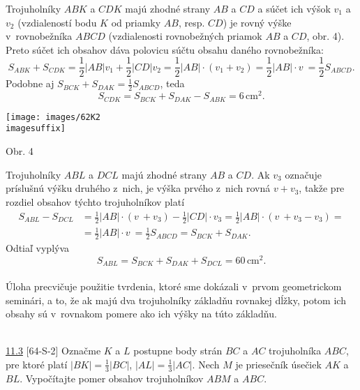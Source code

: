 \rieh Trojuholníky $ABK$ a $CDK$ majú zhodné strany $AB$ a $CD$ a súčet ich výšok $v_1$ a $v_2$ (vzdialeností bodu $K$ od priamky $AB$, resp. $CD$) je rovný výške v~rovnobežníka $ABCD$ (vzdialenosti rovnobežných priamok $AB$ a $CD$, obr. 4). Preto súčet ich obsahov dáva polovicu súčtu obsahu daného rovnobežníka:
$$S_{ABK} + S_{CDK} = \frac{1}{2} |AB|v_1 +\frac{1}{2} |CD|v_2 = \frac{1}{2}|AB| \cdot (v_1 + v_2 ) =\frac{1}{2}|AB| \cdot v~=\frac{1}{2} S_{ABCD}.$$
Podobne aj $S_{BCK} + S_{DAK} =\frac{1}{2} S_{ABCD}$, teda
$$S_{CDK} = S_{BCK} + S_{DAK} - S_{ABK}= 6\,\text{cm}^2.$$
\begin{center}
\texttt{[image: images/62K2\\imagesuffix]}

Obr. 4
\end{center}
Trojuholníky $ABL$ a $DCL$ majú zhodné strany $AB$ a $CD$. Ak $v_3$ označuje príslušnú výšku druhého z~nich, je výška prvého z~nich rovná $v + v_3$, takže pre rozdiel obsahov týchto trojuholníkov platí
\begin{align*}
S_{ABL} - S_{DCL} &= \frac{1}{2} |AB| \cdot (v~+ v_3 ) - \frac{1}{2}|CD|\cdot v_3 =\frac{1}{2} |AB| \cdot (v~+ v_3 - v_3 ) =\\
&= \frac{1}{2} |AB| \cdot v~= \frac{1}{2} S_{ABCD} = S_{BCK} + S_{DAK}.
\end{align*}
Odtiaľ vyplýva
$$S_{ABL} = S_{BCK} + S_{DAK} + S_{DCL} = 60\,\text{cm}^2.$$
\\
\kom Úloha precvičuje použitie tvrdenia, ktoré sme dokázali v~prvom geometrickom seminári, a to, že ak majú dva trojuholníky základňu rovnakej dĺžky, potom ich obsahy sú v~rovnakom pomere ako ich výšky na túto základňu.\\
\\
\begin{tcolorbox}[breakable,notitle,boxrule=0pt,colback=light-gray,colframe=light-gray]\ul{11.3} [64-S-2] Označme $K$ a $L$ postupne body strán $BC$ a $AC$ trojuholníka $ABC$, pre ktoré platí $|BK|= \frac{1}{3}|BC|$, $|AL| =\frac{1}{3}|AC|$. Nech $M$ je priesečník úsečiek $AK$ a $BL$. Vypočítajte pomer obsahov trojuholníkov $ABM$ a $ABC$.

\end{tcolorbox}

